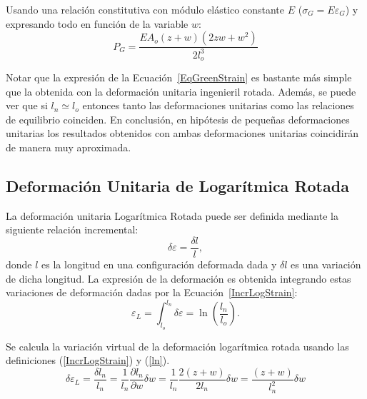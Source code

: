 Usando una relación constitutiva con módulo elástico constante $E$ ($\sigma_G = E \varepsilon_G$) y expresando todo en función de la variable $w$:
%
\begin{equation}\label{EqGreenStrain}
P_G = \frac{EA_o(z+w)\left(2zw+w^2\right)}{2l_o^3}
\end{equation}

Notar que la expresión de la Ecuación~\eqref{EqGreenStrain} es bastante más simple que la obtenida con la deformación unitaria ingenieril rotada. Además, se puede ver que si $l_n\simeq l_o$ entonces tanto las deformaciones unitarias como las relaciones de equilibrio coinciden. En conclusión, en hipótesis de pequeñas deformaciones unitarias los resultados obtenidos con ambas deformaciones unitarias coincidirán de manera muy aproximada.

\subsection{Deformación Unitaria de Logarítmica Rotada}

La deformación unitaria Logarítmica Rotada puede ser definida mediante la siguiente relación incremental:
%
\begin{equation}\label{IncrLogStrain}
\delta \varepsilon = \frac{\delta l}{l},
\end{equation}
%
donde $l$ es la longitud en una configuración deformada dada y $\delta l$ es una variación de dicha longitud. %
La expresión de la deformación es obtenida integrando estas variaciones de deformación dadas por la Ecuación~\eqref{IncrLogStrain}:
%
\begin{equation}\label{LogStrain}
\varepsilon_L = \int_{l_o}^{l_n}\delta \varepsilon = \ln\left(\frac{l_n}{l_o}\right).
\end{equation}


Se calcula la variación virtual de la deformación logarítmica rotada usando las definiciones (\ref{IncrLogStrain}) y (\ref{ln}).
%
\begin{equation}\label{VirtLogStrain}
\delta \varepsilon_L = \frac{\delta l_n}{l_n} = \frac{1}{l_n}\frac{\partial l_n}{\partial w}\delta w = \frac{1}{l_n} \frac{2(z+w)}{2l_n}\delta w = \frac{(z+w)}{l_n^2}\delta w
\end{equation}

